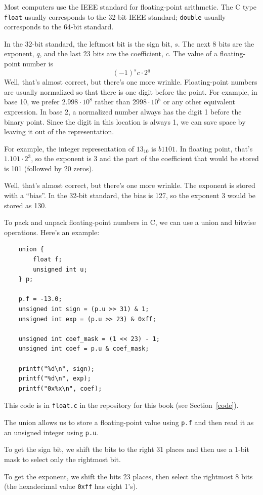 \documentclass[12pt]{book}
\begin{document}
Most computers use the IEEE standard for floating-point
arithmetic.  The C type {\tt float} usually corresponds
to the 32-bit IEEE standard; {\tt double} usually corresponds
to the 64-bit standard.

In the 32-bit standard, the leftmost bit is the sign bit, $s$.
The next 8 bits are the exponent, $q$, and the last 23 bits are
the coefficient, $c$.  The value of a floating-point number is
%
\[ (-1)^s c \cdot 2^q \]
%
Well, that's almost correct, but there's one more wrinkle.
Floating-point numbers are usually normalized so that there is
one digit before the point.  For example, in base 10, we prefer
$2.998 \cdot 10^8$ rather than $2998 \cdot 10^5$ or any other
equivalent expression.  In base 2, a normalized number always
has the digit 1 before the binary point.  Since the digit in
this location is always 1, we can save space by leaving it
out of the representation.

For example, the integer representation of $13_{10}$ is $b1101$.
In floating point, that's $1.101 \cdot 2^3$, so the exponent
is 3 and the part of the coefficient that would be stored
is 101 (followed by 20 zeros).

Well, that's almost correct, but there's one more wrinkle.
The exponent is stored with a ``bias''.  In the 32-bit standard,
the bias is 127, so the exponent 3 would be stored as 130.

To pack and unpack floating-point numbers in C, we can use a 
union and bitwise operations.  Here's an example:
%
\begin{verbatim}
    union {
        float f;
        unsigned int u;
    } p;

    p.f = -13.0;
    unsigned int sign = (p.u >> 31) & 1;
    unsigned int exp = (p.u >> 23) & 0xff;

    unsigned int coef_mask = (1 << 23) - 1;
    unsigned int coef = p.u & coef_mask;

    printf("%d\n", sign);
    printf("%d\n", exp);
    printf("0x%x\n", coef);
\end{verbatim}
%
This code is in {\tt float.c} in the repository for this
book (see Section~\ref{code}).

The union allows us to store a floating-point value using
{\tt p.f} and then read it as an unsigned integer using
{\tt p.u}.

To get the sign bit, we shift the bits to the right 31
places and then use a 1-bit mask to select only the
rightmost bit.

To get the exponent, we shift the bits 23 places, then select the
rightmost 8 bits (the hexadecimal value {\tt 0xff} has eight 1's).
\end{document}

